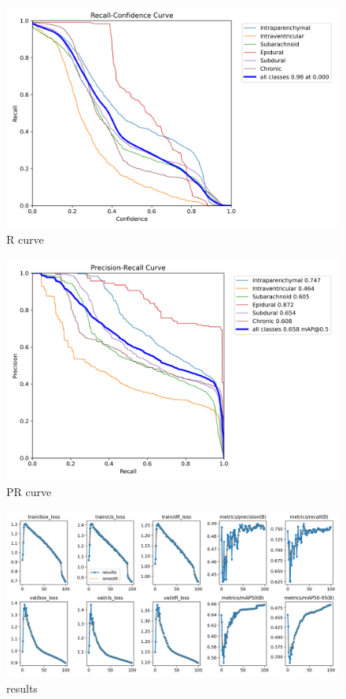 \documentclass[Print]{../Style/isecure-v24}
\begin{document}
{\begin{figure}[h]
    \centering
    \includegraphics[width=1.0\linewidth]{ISeCure Draft/Images/R_curve.png}
    \captionsetup{font=small}
    \caption{R curve}
    \label{fig:r}
\end{figure}}

{\begin{figure}[h]
    \centering
    \includegraphics[width=1.0\linewidth]{ISeCure Draft/Images/PR_curve.png}
    \captionsetup{font=small}
    \caption{PR curve}
    \label{fig:pr}
\end{figure}}

{\begin{figure}[h]
    \centering
    \includegraphics[width=1.0\linewidth]{ISeCure Draft/Images/results.png}
    \captionsetup{font=small}
    \caption{results}
    \label{fig:res}
\end{figure}}
\end{document}

